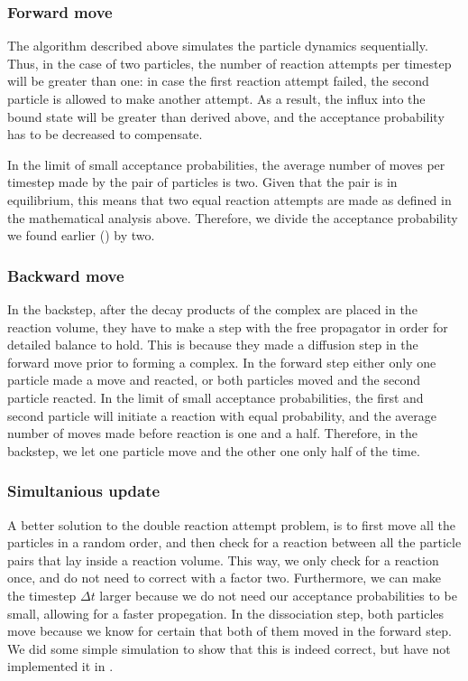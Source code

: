 \subsubsection{Forward move}
The algorithm described above simulates the particle dynamics sequentially. Thus, in the case of two particles, the number of reaction attempts per timestep will be greater than one: in case the first reaction attempt failed, the second particle is allowed to make another attempt. As a result, the influx into the bound state will be greater than derived above, and the acceptance probability has to be decreased to compensate.

In the limit of small acceptance probabilities, the average number of moves per timestep made by the pair of particles is two. Given that the pair is in equilibrium, this means that two equal reaction attempts are made as defined in the mathematical analysis above. Therefore, we divide the acceptance probability we found earlier () by two.

\subsubsection{Backward move}
In the backstep, after the decay products of the complex are placed in the reaction volume, they have to make a step with the free propagator in order for detailed balance to hold. This is because they made a diffusion step in the forward move prior to forming a complex. In the forward step either only one particle made a move and reacted, or both particles moved and the second particle reacted. In the limit of small acceptance probabilities, the first and second particle will initiate a reaction with equal probability, and the average number of moves made before reaction is one and a half. Therefore, in the backstep, we let one particle move and the other one only half of the time.

\subsubsection{Simultanious update}
A better solution to the double reaction attempt problem, is to first move all the particles in a random order, and then check for a reaction between all the particle pairs that lay inside a reaction volume. This way, we only check for a reaction once, and do not need to correct with a factor two. Furthermore, we can make the timestep $\Delta t$ larger because we do not need our acceptance probabilities to be small, allowing for a faster propegation. In the dissociation step, both particles move because we know for certain that both of them moved in the forward step. We did some simple simulation to show that this is indeed correct, but have not implemented it in \GFRD.


